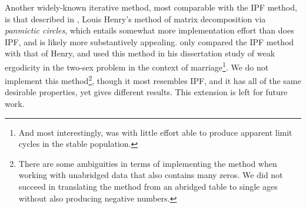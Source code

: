 
Another widely-known iterative method, most comparable with the IPF method, is
that described in \citet{henry1972nuptiality}, Louis Henry's method of matrix
decomposition via \textit{panmictic circles}, which entails somewhat more
implementation effort than does IPF, and is likely more substantively appealing. 
\citet{mc1975models} only compared the
IPF method with that of Henry, and \citet{wijewickrema1980weak} used this method 
in his dissertation study of weak ergodicity in the two-sex problem in the
context of marriage\footnote{And most interestingly, was with little
effort able to produce apparent limit cycles in the stable population.}. We do
not implement this method\footnote{There are some ambiguities in terms of 
implementing the method when working with unabridged data that also contains 
many zeros. We did not succeed in translating the method from an
abridged table to single ages without also producing negative numbers.}, though
it most resembles IPF, and it has all of the same desirable properties, yet
gives different results. This extension is left for future work.






